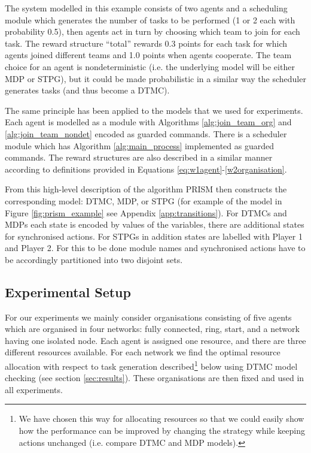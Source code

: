 \documentclass{llncs}
\begin{document}
The system modelled in this example consists of two agents and a scheduling module which generates the number of tasks to be performed (1 or 2 each with probability 0.5), then agents act in turn by choosing which team to join for each task. The reward structure ``total'' rewards 0.3 points for each task for which agents joined different teams and 1.0 points when agents cooperate. The team choice for an agent is nondeterministic (i.e. the underlying model will be either MDP or STPG), but it could be made probabilistic in a similar way the scheduler generates tasks (and thus become a DTMC).

The same principle has been applied to the models that we used for experiments. Each agent is modelled as a module with Algorithms \ref{alg:join_team_org} and \ref{alg:join_team_nondet} encoded as guarded commands. There is a scheduler module which has Algorithm \ref{alg:main_process} implemented as guarded commands. The reward structures are also described in a similar manner according to definitions provided in Equations \ref{eq:w1agent}-\ref{w2organisation}. 

From this high-level description of the algorithm PRISM then constructs the corresponding model: DTMC, MDP, or STPG (for example of the model in Figure \ref{fig:prism_example} see Appendix \ref{app:transitions}). For DTMCs and MDPs each state is encoded by values of the variables, there are additional states for synchronised actions. For STPGs in addition states are labelled with Player 1 and Player 2. For this to be done module names and synchronised actions have to be accordingly partitioned into two disjoint sets.

\subsection{Experimental Setup}
\label{subsec:exp_set}
For our experiments we mainly consider organisations consisting of five agents which are organised in four networks: fully connected, ring, start, and a network having one isolated node. Each agent is assigned one resource, and there are three different resources available. For each network we find the optimal resource allocation with respect to task generation described\footnote{We have chosen this way for allocating resources so that we could easily show how the performance can be improved by changing the strategy while keeping actions unchanged (i.e. compare DTMC and MDP models).} below using DTMC model checking (see section \ref{sec:results}). These organisations are then fixed and used in all experiments.
\end{document}
